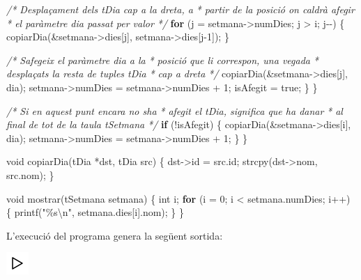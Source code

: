 \documentclass[]{book}
\newenvironment{Shaded}{\begin{snugshade}}{\end{snugshade}}
\newcommand{\CommentTok}[1]{\textcolor[rgb]{0.56,0.35,0.01}{\textit{#1}}}
\newcommand{\ControlFlowTok}[1]{\textcolor[rgb]{0.13,0.29,0.53}{\textbf{#1}}}
\newcommand{\DataTypeTok}[1]{\textcolor[rgb]{0.13,0.29,0.53}{#1}}
\newcommand{\DecValTok}[1]{\textcolor[rgb]{0.00,0.00,0.81}{#1}}
\newcommand{\NormalTok}[1]{#1}
\newcommand{\SpecialCharTok}[1]{\textcolor[rgb]{0.00,0.00,0.00}{#1}}
\newcommand{\StringTok}[1]{\textcolor[rgb]{0.31,0.60,0.02}{#1}}
\begin{document}
\begin{Shaded}
\begin{Highlighting}[]
            \CommentTok{/* Desplaçament dels tDia cap a la dreta, a}
\CommentTok{             * partir de la posició on caldrà afegir }
\CommentTok{             * el paràmetre dia passat per valor }
\CommentTok{             */}
            \ControlFlowTok{for}\NormalTok{ (j = setmana{-}\textgreater{}numDies; j \textgreater{} i; j{-}{-}) \{}
\NormalTok{                copiarDia(\&setmana{-}\textgreater{}dies[j], setmana{-}\textgreater{}dies[j{-}}\DecValTok{1}\NormalTok{]);    }
\NormalTok{            \}}
            
            \CommentTok{/* S\textquotesingle{}afegeix el paràmetre dia a la }
\CommentTok{             * posició que li correspon, una vegada}
\CommentTok{             * desplaçats la resta de tuples tDia }
\CommentTok{             * cap a dreta }
\CommentTok{             */}
\NormalTok{            copiarDia(\&setmana{-}\textgreater{}dies[j], dia);}
\NormalTok{            setmana{-}\textgreater{}numDies = setmana{-}\textgreater{}numDies + }\DecValTok{1}\NormalTok{;}
\NormalTok{            isAfegit = true;}
\NormalTok{        \}}
\NormalTok{    \}}

    \CommentTok{/* Si en aquest punt encara no s\textquotesingle{}ha }
\CommentTok{     * afegit el tDia, significa que ha d\textquotesingle{}anar}
\CommentTok{     * al final de tot de la taula tSetmana }
\CommentTok{     */}
    \ControlFlowTok{if}\NormalTok{ (!isAfegit) \{}
\NormalTok{        copiarDia(\&setmana{-}\textgreater{}dies[i], dia);}
\NormalTok{        setmana{-}\textgreater{}numDies = setmana{-}\textgreater{}numDies + }\DecValTok{1}\NormalTok{;}
\NormalTok{    \}}
\NormalTok{\}}

\DataTypeTok{void}\NormalTok{ copiarDia(tDia *dst, tDia src) \{    }
\NormalTok{    dst{-}\textgreater{}id = src.id; }
\NormalTok{    strcpy(dst{-}\textgreater{}nom, src.nom);}
\NormalTok{\}}

\DataTypeTok{void}\NormalTok{ mostrar(tSetmana setmana) \{}
    \DataTypeTok{int}\NormalTok{ i;}
    \ControlFlowTok{for}\NormalTok{ (i = }\DecValTok{0}\NormalTok{; i \textless{} setmana.numDies; i++) \{}
\NormalTok{        printf(}\StringTok{"\%s}\SpecialCharTok{\textbackslash{}n}\StringTok{"}\NormalTok{, setmana.dies[i].nom);}
\NormalTok{    \}}
\NormalTok{\}}
\end{Highlighting}
\end{Shaded}

L'execució del programa genera la següent sortida:

\includegraphics{./img/play.png}
\end{document}
